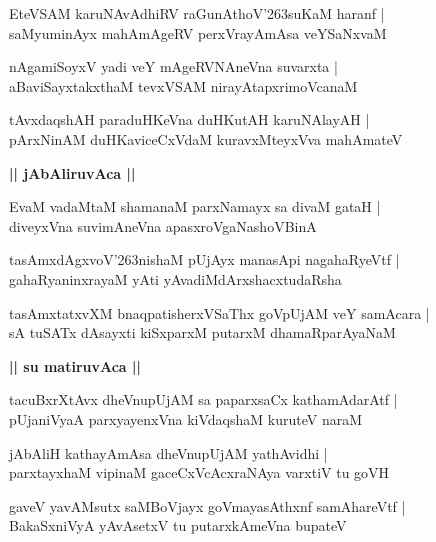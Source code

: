 \documentclass[twoside,12pt,openright]{book}
\def\S{\char'263}
\newcounter{shloka}[chapter]
\def\uvaca#1{\centerline{{\large\textbf{#1}}}}
\begin{document}
\begin{shloka}%
EteVSAM karuNAvAdhiRV raGunAthoV\S suKaM haranf |\\
saMyuminAyx mahAmAgeRV perxVrayAmAsa veYSaNxvaM 
\end{shloka}

\begin{shloka}%
nAgamiSoyxV yadi veY mAgeRVNAneVna suvarxta |\\
aBaviSayxtakxthaM tevxVSAM nirayAtapxrimoVcanaM
\end{shloka}

\begin{shloka}%
tAvxdaqshAH paraduHKeVna duHKutAH karuNAlayAH |\\
pArxNinAM duHKaviceCxVdaM kuravxMteyxVva mahAmateV 
\end{shloka}

\uvaca{|| jAbAliruvAca ||}

\begin{shloka}%
EvaM vadaMtaM shamanaM parxNamayx sa divaM gataH |\\
diveyxVna suvimAneVna apasxroVgaNashoVBinA
\end{shloka}

\begin{shloka}%
tasAmxdAgxvoV\S nishaM pUjAyx manasApi nagahaRyeVtf |\\
gahaRyaninxrayaM yAti yAvadiMdArxshacxtudaRsha 
\end{shloka}

\begin{shloka}%
tasAmxtatxvXM bnaqpatisherxVSaThx goVpUjAM veY samAcara |\\
sA tuSATx dAsayxti kiSxparxM putarxM dhamaRparAyaNaM 
\end{shloka}

\uvaca{|| su matiruvAca ||}

\begin{shloka}%
tacuBxrXtAvx dheVnupUjAM sa paparxsaCx kathamAdarAtf |\\
pUjaniVyaA parxyayenxVna kiVdaqshaM kuruteV naraM 
\end{shloka}

\begin{shloka}%
jAbAliH kathayAmAsa dheVnupUjAM yathAvidhi |\\
parxtayxhaM vipinaM gaceCxVcAcxraNAya varxtiV tu goVH
\end{shloka}

\begin{shloka}%
gaveV yavAMsutx saMBoVjayx goVmayasAthxnf samAhareVtf |\\
BakaSxniVyA yAvAsetxV tu putarxkAmeVna bupateV
\end{shloka}
\end{document}
